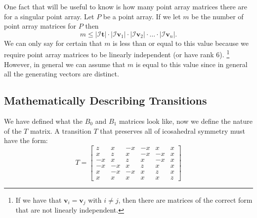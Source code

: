 \documentclass[a4paper,10pt]{article}
\let\oldfootnote\footnote
\renewcommand{\footnote}{\unskip\oldfootnote}
\theoremstyle{plain}
\theoremstyle{definition}
\theoremstyle{remark}
\renewcommand{\vec}[1]{\mathbf{#1}}
\newcommand\abs[1]{\left|#1\right|}
\begin{document}
One fact that will be useful to know is how many point array matrices there are for a singular point array.
Let \( P \) be a point array.
If we let \( m \) be the number of point array matrices for \( P \) then
\[m \leq \abs{\mathcal{I}\vec{t}} \cdot \abs{\mathcal{I}\vec{v}_1} \cdot \abs{\mathcal{I}\vec{v}_2} \cdot \dots \cdot \abs{\mathcal{I}\vec{v}_n}.\]
We can only say for certain that \( m \) is less than or equal to this value because we require point array matrices to be linearly independent (or have rank 6).
\footnote{If we have that \( \vec{v}_i = \vec{v}_j \) with \( i \neq j \), then there are matrices of the correct form that are not linearly independent.}
However, in general we can assume that \( m \) is equal to this value since in general all the generating vectors are distinct.

\subsection{Mathematically Describing Transitions}
We have defined what the \( B_0 \) and \( B_1 \) matrices look like, now we define the nature of the \( T \) matrix.
A transition \(T\) that preserves all of icosahedral symmetry must have the form: \begin{equation} \label{eq:ico-transition}
	T = \begin{bmatrix}
		z  & x  & -x & -x & x  & x \\
		x  & z  & x  & -x & -x & x \\
		-x & x  & z  & x  & -x & x \\
		-x & -x & x  & z  & x  & x \\
		x  & -x & -x & x  & z  & x \\
		x  & x  & x  & x  & x  & z
\end{bmatrix}\end{equation}
\end{document}
